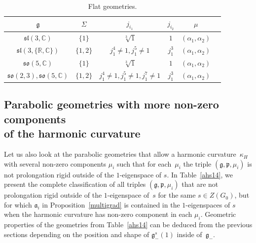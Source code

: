 \documentclass[10pt,a4paper]{amsart}
\newcommand{\fg}{\mathfrak g}
\newcommand{\fp}{\mathfrak p}
\numberwithin{equation}{section}
\begin{document}
\begin{table}[th!]\centering \caption{Flat geometries.}\label{ahs13}\vspace{1mm}

\begin{tabular}{|c|c|c|c|c|c|}
\hline
$\fg$ & $\Sigma$ & $j_{i_1}$& $j_{i_2}$& $\mu$ \\
\hline
\hline
$\mathfrak{sl}(3,\mathbb{C})$ & $\{1\}$&$\sqrt[3]{1}$&$1$&$(\alpha_{1},\alpha_2)$\\
\hline
$\mathfrak{sl}(3,\{\mathbb{R},\mathbb{C}\})$ & $\{1,2\}$&$j_1^4\neq1, j_1^5\neq 1$&$j_1^3$&$(\alpha_{1},\alpha_2)$\\
\hline
$\mathfrak{so}(5,\mathbb{C})$ & $\{1\}$&$\sqrt[3]{1}$&$1$&$(\alpha_{1},\alpha_2)$\\
\hline
$\mathfrak{so}(2,3), \mathfrak{so}(5,\mathbb{C})$ & $\{1,2\}$&$j_1^4\neq1, j_1^5\neq 1, j_1^7\neq 1$&$j_1^3$&$(\alpha_{1},\alpha_2)$\\
\hline
\end{tabular}
\end{table}

\subsection[Parabolic geometries with more non-zero components of the harmonic curvature]{Parabolic geometries with more non-zero components \\ of the harmonic curvature}

Let us also look at the parabolic geometries that allow a harmonic curvature~$\kappa_H$ with several non-zero components $\mu_i$ such that for each~$\mu_i$ the triple $(\fg,\fp,\mu_i)$ is not prolongation rigid outside of the $1$-eigenspace of $s$. In Table~\ref{ahs14}, we present the complete classif\/ication of all triples $(\fg,\fp,\mu_i)$ that are not prolongation rigid outside of the $1$-eigenspace of~$s$ for the same $s\in Z(G_0)$, but for which $\mathfrak{a}_i$ in Proposition~\ref{multigrad} is contained in the $1$-eigenspaces of $s$ when the harmonic curvature has non-zero component in each $\mu_i$. Geometric properties of the geometries from Table~\ref{ahs14} can be deduced from the previous sections depending on the position and shape of $\fg_{-}^s(1)$ inside of~$\fg_-$.
\end{document}
